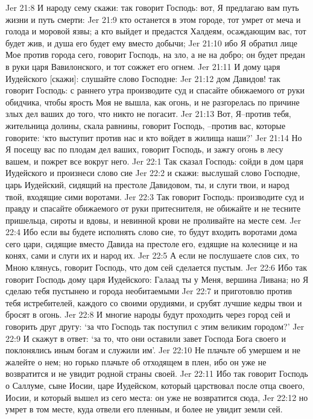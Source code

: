 Jer 21:8  И народу сему скажи: так говорит Господь: вот, Я предлагаю вам путь жизни и путь смерти:
Jer 21:9  кто останется в этом городе, тот умрет от меча и голода и моровой язвы; а кто выйдет и предастся Халдеям, осаждающим вас, тот будет жив, и душа его будет ему вместо добычи;
Jer 21:10  ибо Я обратил лице Мое против города сего, говорит Господь, на зло, а не на добро; он будет предан в руки царя Вавилонского, и тот сожжет его огнем.
Jer 21:11  И дому царя Иудейского [скажи]: слушайте слово Господне:
Jer 21:12  дом Давидов! так говорит Господь: с раннего утра производите суд и спасайте обижаемого от руки обидчика, чтобы ярость Моя не вышла, как огонь, и не разгорелась по причине злых дел ваших до того, что никто не погасит.
Jer 21:13  Вот, Я--против тебя, жительница долины, скала равнины, говорит Господь, --против вас, которые говорите: `кто выступит против нас и кто войдет в жилища наши?'
Jer 21:14  Но Я посещу вас по плодам дел ваших, говорит Господь, и зажгу огонь в лесу вашем, и пожрет все вокруг него.
Jer 22:1  Так сказал Господь: сойди в дом царя Иудейского и произнеси слово сие
Jer 22:2  и скажи: выслушай слово Господне, царь Иудейский, сидящий на престоле Давидовом, ты, и слуги твои, и народ твой, входящие сими воротами.
Jer 22:3  Так говорит Господь: производите суд и правду и спасайте обижаемого от руки притеснителя, не обижайте и не тесните пришельца, сироты и вдовы, и невинной крови не проливайте на месте сем.
Jer 22:4  Ибо если вы будете исполнять слово сие, то будут входить воротами дома сего цари, сидящие вместо Давида на престоле его, ездящие на колеснице и на конях, сами и слуги их и народ их.
Jer 22:5  А если не послушаете слов сих, то Мною клянусь, говорит Господь, что дом сей сделается пустым.
Jer 22:6  Ибо так говорит Господь дому царя Иудейского: Галаад ты у Меня, вершина Ливана; но Я сделаю тебя пустынею и города необитаемыми
Jer 22:7  и приготовлю против тебя истребителей, каждого со своими орудиями, и срубят лучшие кедры твои и бросят в огонь.
Jer 22:8  И многие народы будут проходить через город сей и говорить друг другу: `за что Господь так поступил с этим великим городом?'
Jer 22:9  И скажут в ответ: `за то, что они оставили завет Господа Бога своего и поклонялись иным богам и служили им'.
Jer 22:10  Не плачьте об умершем и не жалейте о нем; но горько плачьте об отходящем в плен, ибо он уже не возвратится и не увидит родной страны своей.
Jer 22:11  Ибо так говорит Господь о Саллуме, сыне Иосии, царе Иудейском, который царствовал после отца своего, Иосии, и который вышел из сего места: он уже не возвратится сюда,
Jer 22:12  но умрет в том месте, куда отвели его пленным, и более не увидит земли сей.

